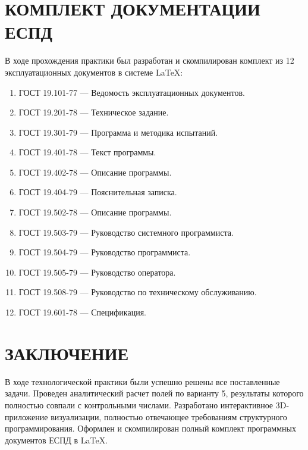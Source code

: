 \documentclass[11pt,russian]{article}
\begin{document}
\newpage

\section{КОМПЛЕКТ ДОКУМЕНТАЦИИ ЕСПД}
В ходе прохождения практики был разработан и скомпилирован комплект из 12 эксплуатационных документов в системе LaTeX:
\begin{enumerate}
    \item ГОСТ 19.101-77 — Ведомость эксплуатационных документов.
    \item ГОСТ 19.201-78 — Техническое задание.
    \item ГОСТ 19.301-79 — Программа и методика испытаний.
    \item ГОСТ 19.401-78 — Текст программы.
    \item ГОСТ 19.402-78 — Описание программы.
    \item ГОСТ 19.404-79 — Пояснительная записка.
    \item ГОСТ 19.502-78 — Описание программы.
    \item ГОСТ 19.503-79 — Руководство системного программиста.
    \item ГОСТ 19.504-79 — Руководство программиста.
    \item ГОСТ 19.505-79 — Руководство оператора.
    \item ГОСТ 19.508-79 — Руководство по техническому обслуживанию.
    \item ГОСТ 19.601-78 — Спецификация.
\end{enumerate}

\section*{ЗАКЛЮЧЕНИЕ}
В ходе технологической практики были успешно решены все поставленные задачи. Проведен аналитический расчет полей по варианту 5, результаты которого полностью совпали с контрольными числами. Разработано интерактивное 3D-приложение визуализации, полностью отвечающее требованиям структурного программирования. Оформлен и скомпилирован полный комплект программных документов ЕСПД в LaTeX.
\end{document}

